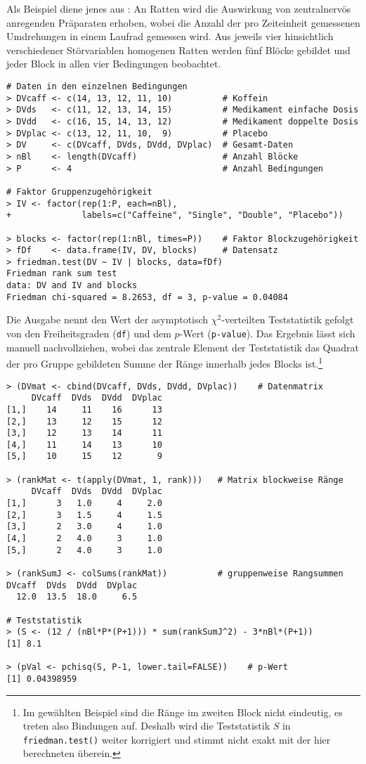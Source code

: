 Als Beispiel diene jenes aus : An Ratten wird die Auswirkung von zentralnervös anregenden Präparaten erhoben, wobei die Anzahl der pro Zeiteinheit gemessenen Umdrehungen in einem Laufrad gemessen wird. Aus jeweils vier hinsichtlich verschiedener Störvariablen homogenen Ratten werden fünf Blöcke gebildet und jeder Block in allen vier Bedingungen beobachtet.
\begin{lstlisting}
# Daten in den einzelnen Bedingungen
> DVcaff <- c(14, 13, 12, 11, 10)          # Koffein
> DVds   <- c(11, 12, 13, 14, 15)          # Medikament einfache Dosis
> DVdd   <- c(16, 15, 14, 13, 12)          # Medikament doppelte Dosis
> DVplac <- c(13, 12, 11, 10,  9)          # Placebo
> DV     <- c(DVcaff, DVds, DVdd, DVplac)  # Gesamt-Daten
> nBl    <- length(DVcaff)                 # Anzahl Blöcke
> P      <- 4                              # Anzahl Bedingungen

# Faktor Gruppenzugehörigkeit
> IV <- factor(rep(1:P, each=nBl),
+              labels=c("Caffeine", "Single", "Double", "Placebo"))

> blocks <- factor(rep(1:nBl, times=P))    # Faktor Blockzugehörigkeit
> fDf    <- data.frame(IV, DV, blocks)     # Datensatz
> friedman.test(DV ~ IV | blocks, data=fDf)
Friedman rank sum test
data: DV and IV and blocks
Friedman chi-squared = 8.2653, df = 3, p-value = 0.04084
\end{lstlisting}

Die Ausgabe nennt den Wert der asymptotisch $\chi^{2}$-verteilten Teststatistik gefolgt von den Freiheitsgraden (\lstinline!df!) und dem $p$-Wert (\lstinline!p-value!). Das Ergebnis lässt sich manuell nachvollziehen, wobei das zentrale Element der Teststatistik das Quadrat der pro Gruppe gebildeten Summe der Ränge innerhalb jedes Blocks ist.\footnote{Im gewählten Beispiel sind die Ränge im zweiten Block nicht eindeutig, es treten also Bindungen auf. Deshalb wird die Teststatistik $S$ in \lstinline!friedman.test()! weiter korrigiert und stimmt nicht exakt mit der hier berechneten überein.}
\begin{lstlisting}
> (DVmat <- cbind(DVcaff, DVds, DVdd, DVplac))    # Datenmatrix
     DVcaff  DVds  DVdd  DVplac
[1,]    14     11    16      13
[2,]    13     12    15      12
[3,]    12     13    14      11
[4,]    11     14    13      10
[5,]    10     15    12       9

> (rankMat <- t(apply(DVmat, 1, rank)))   # Matrix blockweise Ränge
     DVcaff  DVds  DVdd  DVplac
[1,]      3   1.0     4     2.0
[2,]      3   1.5     4     1.5
[3,]      2   3.0     4     1.0
[4,]      2   4.0     3     1.0
[5,]      2   4.0     3     1.0

> (rankSumJ <- colSums(rankMat))          # gruppenweise Rangsummen
DVcaff  DVds  DVdd  DVplac
  12.0  13.5  18.0     6.5

# Teststatistik
> (S <- (12 / (nBl*P*(P+1))) * sum(rankSumJ^2) - 3*nBl*(P+1))
[1] 8.1

> (pVal <- pchisq(S, P-1, lower.tail=FALSE))    # p-Wert
[1] 0.04398959
\end{lstlisting}


